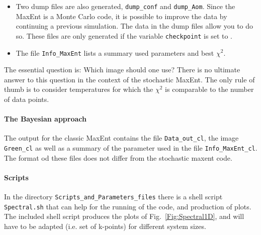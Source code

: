 \begin{itemize}
\item Two dump files are also generated, \texttt{dump\_conf} and \texttt{dump\_Aom}. Since the MaxEnt is a Monte Carlo code, it is possible to improve the data by continuing a previous simulation. The data in the dump files allow you to do so. These files are only generated if the variable \texttt{checkpoint} is set to . 

\item The  file \texttt{Info\_MaxEnt} lists a summary   used parameters  and  best $\chi^2$.  


\end{itemize}

The essential question is: Which image should one use? There is no ultimate answer to this question in the 
context of the stochastic MaxEnt. The only rule of thumb is to consider temperatures for which the \( \chi^2 \) 
is  comparable to the number of data points.

\paragraph*{The Bayesian approach}
The  output   for the classic  MaxEnt  contains  the  file  \texttt{Data\_out\_cl},  the   image \texttt{Green\_cl}  as  
well  as  a  summary  of the  parameter  used in the  file  \texttt{Info\_MaxEnt\_cl}.   The  format  od  these  files 
does  not  differ  from the   stochastic  maxent  code. 

\paragraph*{Scripts}
In the  directory  \texttt{Scripts\_and\_Parameters\_files} there  is  a  shell  script  \texttt{Spectral.sh} that can  help  
for  the  running of  the code,  and  production of  plots.   The   included  shell script produces  the  plots of  Fig.~\ref{Fig:Spectral1D}, 
and  will have to  be  adapted  (i.e.  set  of  k-points)   for  different  system  sizes.

